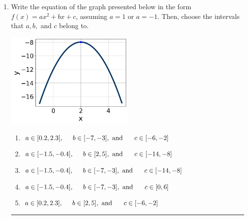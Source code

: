 \documentclass[14pt]{extbook}
\newcommand{\litem}[1]{\item#1\hspace*{-1cm}\rule{\textwidth}{0.4pt}}
\begin{document}
\begin{enumerate}
{\begin{enumerate}[label=\Alph*.]
\end{enumerate} }
\litem{
Write the equation of the graph presented below in the form $f(x)=ax^2+bx+c$, assuming  $a=1$ or $a=-1$. Then, choose the intervals that $a, b,$ and $c$ belong to.
\begin{center}
    \includegraphics[width=0.5\textwidth]{../Figures/quadraticGraphToEquationCopyB.png}
\end{center}
\begin{enumerate}[label=\Alph*.]
\item \( a \in [0.2, 2.3], \hspace*{5mm} b \in [-7, -3], \text{ and } \hspace*{5mm} c \in [-6, -2] \)
\item \( a \in [-1.5, -0.4], \hspace*{5mm} b \in [2, 5], \text{ and } \hspace*{5mm} c \in [-14, -8] \)
\item \( a \in [-1.5, -0.4], \hspace*{5mm} b \in [-7, -3], \text{ and } \hspace*{5mm} c \in [-14, -8] \)
\item \( a \in [-1.5, -0.4], \hspace*{5mm} b \in [-7, -3], \text{ and } \hspace*{5mm} c \in [0, 6] \)
\item \( a \in [0.2, 2.3], \hspace*{5mm} b \in [2, 5], \text{ and } \hspace*{5mm} c \in [-6, -2] \)


\end{enumerate}}
\end{enumerate}
\end{document}
